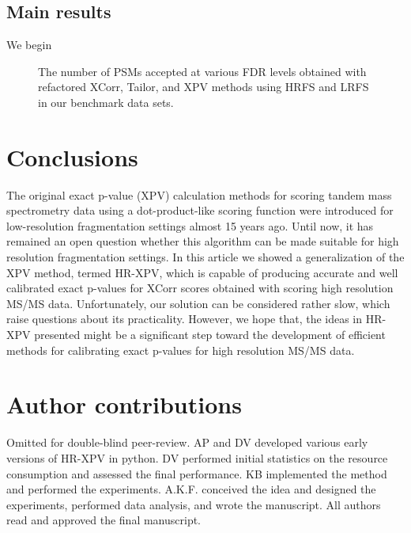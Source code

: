 \documentclass[journal=jpr,manuscript=article]{achemso}
\begin{document}
\subsection{Main results}
We begin 
\begin{figure}[h]
   \centering
   \footnotesize
   \setlength{\tabcolsep}{0pt}	
\caption{The number of PSMs accepted at various FDR levels obtained with refactored XCorr, Tailor, and XPV methods using HRFS and LRFS in our benchmark data sets.}
\label{fg:hrxpv-perf}
\end{figure}

\section{Conclusions}
The original exact p-value (XPV) calculation methods for scoring tandem mass spectrometry data using a dot-product-like scoring function were introduced for low-resolution fragmentation settings almost 15 years ago. Until now, it has remained an open question whether this algorithm can be made suitable for high resolution fragmentation settings. In this article we showed a generalization of the XPV method, termed HR-XPV, which is capable of producing accurate and well calibrated exact p-values for XCorr scores obtained with scoring high resolution MS/MS data. Unfortunately, our solution can be considered rather slow, which raise questions about its practicality. However, we hope that, the ideas in HR-XPV presented might be a significant step toward the development of efficient methods for calibrating exact p-values for high resolution MS/MS data. 

\section*{Author contributions}
\ifdefined\DOUBLEBLINDREVIEW
Omitted for double-blind peer-review.
\else
AP and DV developed various early versions of HR-XPV in python. DV performed initial statistics on the resource consumption and assessed the final performance. KB implemented the method and performed the experiments. A.K.F. conceived the idea and designed the experiments, performed data analysis, and wrote the manuscript. All authors read and approved the final manuscript.
\fi
\end{document}
